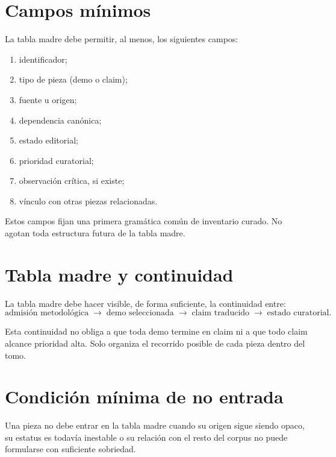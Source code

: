 \section{Campos mínimos}
\begin{definition}
La tabla madre debe permitir, al menos, los siguientes campos:
\begin{enumerate}
  \item identificador;
  \item tipo de pieza (demo o claim);
  \item fuente u origen;
  \item dependencia canónica;
  \item estado editorial;
  \item prioridad curatorial;
  \item observación crítica, si existe;
  \item vínculo con otras piezas relacionadas.
\end{enumerate}
\end{definition}

\begin{observation}
Estos campos fijan una primera gramática común de inventario curado. No agotan toda estructura futura de la tabla madre.
\end{observation}

\section{Tabla madre y continuidad}
\begin{definition}
La tabla madre debe hacer visible, de forma suficiente, la continuidad entre:
\[
\text{admisión metodológica}
\;\longrightarrow\;
\text{demo seleccionada}
\;\longrightarrow\;
\text{claim traducido}
\;\longrightarrow\;
\text{estado curatorial}.
\]
\end{definition}

\begin{observation}
Esta continuidad no obliga a que toda demo termine en claim ni a que todo claim alcance prioridad alta. Solo organiza el recorrido posible de cada pieza dentro del tomo.
\end{observation}

\section{Condición mínima de no entrada}
\begin{definition}
Una pieza no debe entrar en la tabla madre cuando su origen sigue siendo opaco, su estatus es todavía inestable o su relación con el resto del corpus no puede formularse con suficiente sobriedad.
\end{definition}

